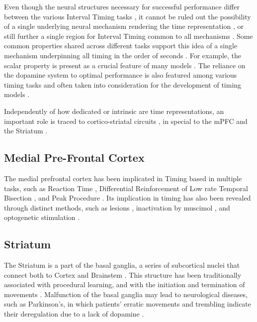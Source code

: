     Even though the neural structures necessary for successful performance differ between the various Interval Timing tasks \cite{paton2018neural}, it cannot be ruled out the possibility of a single underlying neural mechanism rendering the time representation \cite{gibbon1977scalar}, or still further a single region for Interval Timing common to all mechanisms \cite{mello2015scalable}. Some common properties shared across different tasks support this idea of a single mechanism underpinning all timing in the order of seconds \cite{buhusi2005makes, gibbon1977scalar}. For example, the scalar property is present as a crucial feature of many models \cite{gibbon1977scalar, oprisan2014all}. The reliance on the dopamine system to optimal performance is also featured among various timing tasks and often taken into consideration for the development of timing models \cite{kim2017optogenetic, meck2012gene}.
    
    Independently of how dedicated or intrinsic are time representations, an important role is traced to cortico-striatal circuits \cite{lusk2016utilizing, buhusi2005makes, meck2008cortico}, in special to the mPFC \cite{buhusi2018inactivation} and the Striatum \cite{mello2015scalable}.
    
    \subsection{Medial Pre-Frontal Cortex}

        The medial prefrontal cortex has been implicated in Timing based in multiple tasks, such as Reaction Time \cite{narayanan2009delay}, Differential Reinforcement of Low rate \cite{cho2010differential} Temporal Bisection \cite{kim2009inactivation,tiganj2016sequential,kim2013neural}, and Peak Procedure \cite{buhusi2018inactivation}. Its implication in timing has also been revealed through distinct methods, such as lesions \cite{cho2010differential}, inactivation by muscimol \cite{buhusi2018inactivation, kim2009inactivation}, and optogenetic stimulation \cite{kim2017optogenetic}. 

    \subsection{Striatum}
        The Striatum is a part of the basal ganglia, a series of subcortical nuclei that connect both to Cortex and Brainstem \cite{helie2015learning}. This structure has been traditionally associated with procedural learning, and with the initiation and termination of movements \cite{helie2015learning}. Malfunction of the basal ganglia may lead to neurological diseases, such as Parkinson's, in which patients' erratic movements and trembling indicate their deregulation due to a lack of dopamine \cite{buhusi2005makes}.    
        
